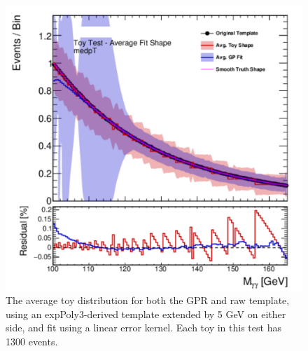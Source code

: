 \begin{figure} 
\begin{center}
  \includegraphics[width=\textwidth]{figures/background/gpr/validation/linear/ToyTest_AvgFitShape_medpT_1300_noSig}   
\caption{The average toy distribution for both the GPR and raw template, using an expPoly3-derived template extended by 5 GeV on either side, and fit using a linear error kernel. Each toy in this test has 1300 events.}
\label{fig:linearkernel_medpt_1300_noSig}
\end{center}
\end{figure}

